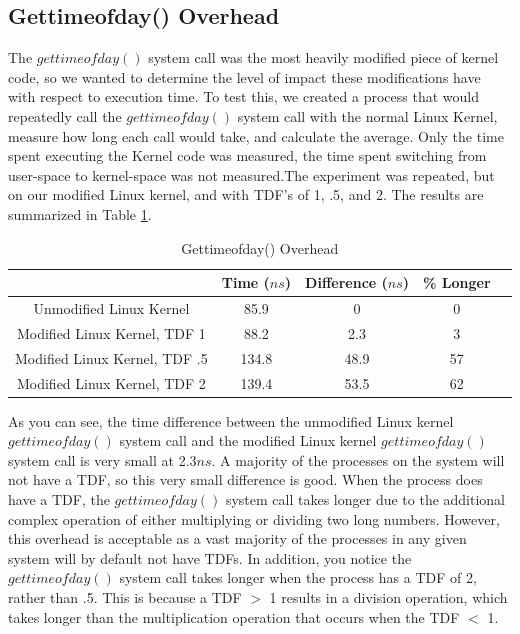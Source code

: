 \subsection{Gettimeofday() Overhead}
The $gettimeofday()$ system call was the most heavily modified piece of kernel code, so we wanted to determine the level of impact these modifications have with respect to execution time. To test this, we created a process that would repeatedly call the $gettimeofday()$ system call with the normal Linux Kernel, measure how long each call would take, and calculate the average. Only the time spent executing the Kernel code was measured, the time spent switching from user-space to kernel-space was not measured.The experiment was repeated, but on our modified Linux kernel, and with TDF's of 1, .5, and 2. The results are summarized in Table \ref{table:gtodOverhead}.

\begin{table} \centering 
\begin{tabular}{|c|c|c|c|c|} 
        \hline 
         & Time ($ns$) & Difference ($ns$) & \% Longer \\ \hline 
        Unmodified Linux Kernel & 85.9 & 0 &  0 \\ \hline 
        Modified Linux Kernel, TDF 1 &  88.2 & 2.3 & 3 \\ \hline 
        Modified Linux Kernel, TDF .5 & 134.8 & 48.9 & 57 \\ \hline 
        Modified Linux Kernel, TDF 2 & 139.4 &  53.5 & 62 \\ \hline 
        \hline 
        \end{tabular} 
        \caption{Gettimeofday() Overhead} 
        \label{table:gtodOverhead} 
\end{table}

As you can see, the time difference between the unmodified Linux kernel $gettimeofday()$ system call and the modified Linux kernel $gettimeofday()$ system call is very small at 2.3$ns$. A majority of the processes on the system will not have a TDF, so this very small difference is good. When the process does have a TDF, the $gettimeofday()$ system call takes longer due to the additional complex operation of either multiplying or dividing two long numbers. However, this overhead is acceptable as a vast majority of the processes in any given system will by default not have TDFs. In addition, you notice the $gettimeofday()$ system call takes longer when the process has a TDF of 2, rather than .5. This is because a TDF $>$ 1 results in a division operation, which takes longer than the multiplication operation that occurs when the TDF $<$ 1.
